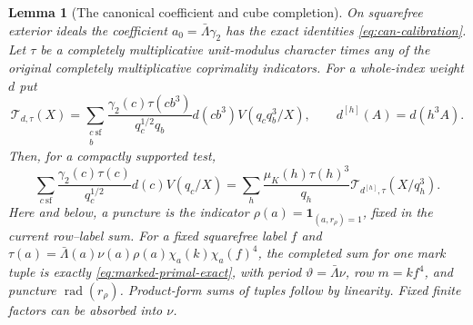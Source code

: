 \documentclass[11pt,a4paper]{article}
\numberwithin{equation}{section}
\newtheorem{lemma}[theorem]{Lemma}
\theoremstyle{definition}
\theoremstyle{remark}
\newcommand{\rad}{\operatorname{rad}}
\newcommand{\ind}{\mathbf 1}
\begin{document}
\begin{lemma}[The canonical coefficient and cube completion]\label{lem:canonical-theta-bridge}
On squarefree exterior ideals the coefficient
$a_0=\bar\Lambda\gamma_2$ has the exact identities
\eqref{eq:can-calibration}.  Let $\tau$ be a completely multiplicative
unit-modulus character times any of the original completely
multiplicative coprimality indicators.  For a whole-index weight $d$
put
\[
 \mathscr T_{d,\tau}(X)=
  \sum_{\substack{c\ \mathrm{sf}\\b}}
     \frac{\gamma_2(c)\tau(cb^3)}{q_c^{1/2}q_b}
             d(cb^3)V(q_cq_b^3/X),\qquad
 d^{[h]}(A)=d(h^3A).
\]
Then, for a compactly supported test,
\begin{equation}\label{eq:canonical-cube-inversion}
 \sum_{c\ \mathrm{sf}}\frac{\gamma_2(c)\tau(c)}{q_c^{1/2}}
                       d(c)V(q_c/X)
 =\sum_h\frac{\mu_K(h)\tau(h)^3}{q_h}
          \mathscr T_{d^{[h]},\tau}(X/q_h^3).
\end{equation}
Here and below, a puncture is the indicator
$\rho(a)=\ind_{(a,r_\rho)=1}$, fixed in the current row--label sum.
For a fixed squarefree label $f$ and
$\tau(a)=\bar\Lambda(a)\nu(a)\rho(a)\chi_a(k)\chi_a(f)^4$,
the completed sum for one mark tuple is exactly
\eqref{eq:marked-primal-exact}, with period
$\vartheta=\bar\Lambda\nu$, row $m=kf^4$, and puncture
$\rad(r_\rho)$.  Product-form sums of tuples follow by linearity.
Fixed finite factors can be absorbed into $\nu$.
\end{lemma}
\end{document}
